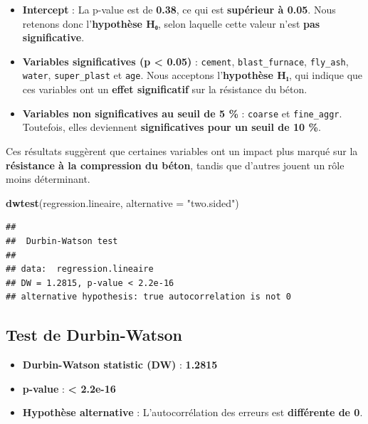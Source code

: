 \documentclass[
  12pt,
]{article}
\newenvironment{Shaded}{\begin{snugshade}}{\end{snugshade}}
\newcommand{\AttributeTok}[1]{\textcolor[rgb]{0.13,0.29,0.53}{#1}}
\newcommand{\FunctionTok}[1]{\textcolor[rgb]{0.13,0.29,0.53}{\textbf{#1}}}
\newcommand{\NormalTok}[1]{#1}
\newcommand{\StringTok}[1]{\textcolor[rgb]{0.31,0.60,0.02}{#1}}
\providecommand{\tightlist}{%
  \setlength{\itemsep}{0pt}\setlength{\parskip}{0pt}}
\begin{document}
\begin{itemize}
\tightlist
\item
  \textbf{Intercept} : La p-value est de \textbf{0.38}, ce qui est
  \textbf{supérieur à 0.05}. Nous retenons donc l'\textbf{hypothèse H₀},
  selon laquelle cette valeur n'est \textbf{pas significative}.
\item
  \textbf{Variables significatives (p \textless{} 0.05)} :
  \texttt{cement}, \texttt{blast\_furnace}, \texttt{fly\_ash},
  \texttt{water}, \texttt{super\_plast} et \texttt{age}. Nous acceptons
  l'\textbf{hypothèse H₁}, qui indique que ces variables ont un
  \textbf{effet significatif} sur la résistance du béton.
\item
  \textbf{Variables non significatives au seuil de 5 \%} :
  \texttt{coarse} et \texttt{fine\_aggr}. Toutefois, elles deviennent
  \textbf{significatives pour un seuil de 10 \%}.
\end{itemize}

Ces résultats suggèrent que certaines variables ont un impact plus
marqué sur la \textbf{résistance à la compression du béton}, tandis que
d'autres jouent un rôle moins déterminant.

\begin{Shaded}
\begin{Highlighting}[]
\FunctionTok{dwtest}\NormalTok{(regression.lineaire, }\AttributeTok{alternative =} \StringTok{"two.sided"}\NormalTok{)}
\end{Highlighting}
\end{Shaded}

\begin{verbatim}
## 
##  Durbin-Watson test
## 
## data:  regression.lineaire
## DW = 1.2815, p-value < 2.2e-16
## alternative hypothesis: true autocorrelation is not 0
\end{verbatim}

\subsection{Test de Durbin-Watson}\label{test-de-durbin-watson}

\begin{itemize}
\tightlist
\item
  \textbf{Durbin-Watson statistic (DW)} : \textbf{1.2815}\\
\item
  \textbf{p-value} : \textbf{\textless{} 2.2e-16}\\
\item
  \textbf{Hypothèse alternative} : L'autocorrélation des erreurs est
  \textbf{différente de 0}.
\end{itemize}
\end{document}

